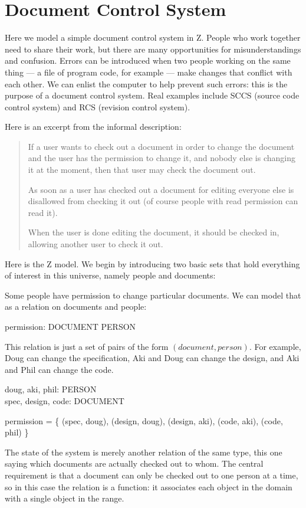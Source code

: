 
\section*{Document Control System}

Here we model a simple document control system in Z.
People who work together need to share their work, but there are many
opportunities for misunderstandings and confusion.  Errors can be
introduced when two people working on the same thing --- a file of
program code, for example --- make changes that conflict with each
other.  We can enlist the computer to help prevent such errors: this
is the purpose of a document control system.  Real examples include
SCCS (source code control system) and RCS (revision control
system).

Here is an excerpt from the informal description:

\begin{quote}
    If a user wants to check out a document in order to change
    the document and the user  has the permission to change it, 
    and nobody else is changing it at the moment, then that user
    may check the document out.

    As soon as a user has checked out a document for editing
    everyone else is disallowed from checking it out (of course people with
    read permission can read it).

    When the user is done editing the document, it should be
    checked in, allowing another user to check it out.
\end{quote}

Here is the Z model.  We begin by introducing two basic sets that
hold everything of interest in this universe, namely people and
documents:

\begin{zed}  \end{zed}
Some people have permission to change particular documents.  We can model
that as a relation on documents and people:

\begin{axdef}
	permission: DOCUMENT \rel PERSON
\end{axdef}
This relation is just a set of pairs of the form $(document, person)$.
For example, Doug can change the specification, Aki and Doug can
change the design, and Aki and Phil can change the code.

\begin{axdef}
	doug, aki, phil: PERSON \\
	spec, design, code: DOCUMENT
\end{axdef}
\begin{zed}
	permission = \{ (spec, doug), (design, doug), (design, aki), (code, aki), (code, phil) \}
\end{zed}
The state of the system is merely another relation of the same type,
this one saying which documents are actually checked out to whom.   The
central requirement is that a document can only be checked out to
one person at a time, so in this case the relation is a function:
it associates each object in the domain with a single
object in the range.  

